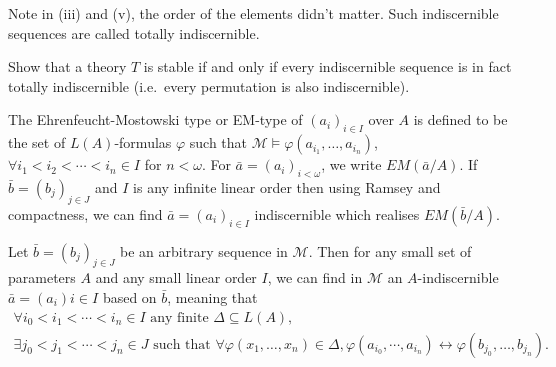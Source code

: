 \documentclass{article}
\let\models\vDash
\begin{document}
Note in (iii) and (v), the order of the elements didn't matter. Such indiscernible sequences are called totally indiscernible.
\begin{ex}
  Show that a theory $T$ is stable if and only if every indiscernible sequence is in fact totally indiscernible (i.e.\ every permutation is also indiscernible).
\end{ex}
\begin{defi}
  The Ehrenfeucht-Mostowski type or EM-type of $(a_i)_{i \in I}$ over $A$ is defined to be the set of $L(A)$-formulas $\varphi$ such that $\mathcal{M} \models \varphi(a_{i_1}, \dotsc, a_{i_n})$, $\forall i_1 < i_2 < \dotsb < i_n \in I$ for $n < \omega$.
  For $\bar{a} = (a_i)_{i < \omega}$, we write $EM(\bar{a}/A)$.
  If $\bar{b}=(b_j)_{j \in J}$ and $I$ is any infinite linear order then using Ramsey and compactness, we can find $\bar{a} = (a_i)_{i  \in I}$ indiscernible which realises $EM(\bar{b}/A)$.
\end{defi}
\begin{prop}
  Let $\bar{b} = (b_j)_{j \in J}$ be an arbitrary sequence in $ \mathcal{M} $.
  Then for any small set of parameters $A$ and any small linear order $I$, we can find in $\mathcal{M}$ an $A$-indiscernible $\bar{a} = (a_i){i \in I}$ based on $\bar{b}$, meaning that
  \begin{gather*}
    \forall i_0 < i_1 < \dotsb < i_n \in I \text{ any finite } \Delta \subseteq L(A), \\
    \exists j_0 < j_1 < \dotsb < j_n \in J \text{ such that } \forall \varphi(x_1, \dotsc, x_n) \in \Delta,
    \varphi(a_{i_0}, \dotsb, a_{i_n}) \leftrightarrow \varphi(b_{j_0}, \dotsc, b_{j_n}).
  \end{gather*}
\end{prop}
\end{document}
